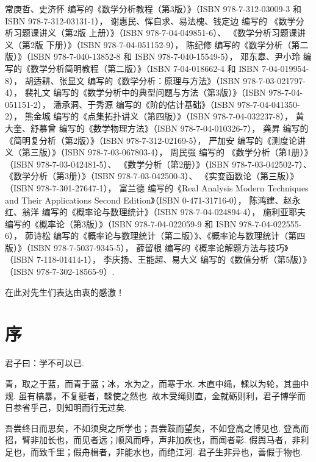 常庚哲、史济怀 编写的《数学分析教程（第3版）》（ISBN 978-7-312-03009-3 和 ISBN 978-7-312-03131-1），
谢惠民、恽自求、易法槐、钱定边 编写的
《数学分析习题课讲义（第2版 上册）》（ISBN 978-7-04-049851-6）、
《数学分析习题课讲义（第2版 下册）》（ISBN 978-7-04-051152-9），
陈纪修 编写的《数学分析（第二版）》（ISBN 978-7-040-13852-8 和 ISBN 978-7-040-15549-5），
邓东皋、尹小玲 编写的《数学分析简明教程（第二版）》（ISBN 7-04-018662-4 和 ISBN 7-04-019954-8），
胡适耕、张显文 编写的《数学分析：原理与方法》（ISBN 978-7-03-021797-4），
裴礼文 编写的《数学分析中的典型问题与方法（第3版）》（ISBN 978-7-04-051151-2），
潘承洞、于秀源 编写的《阶的估计基础》（ISBN 978-7-04-041350-2），
熊金城 编写的《点集拓扑讲义（第四版）》（ISBN 978-7-04-032237-8），
黄大奎、舒慕曾 编写的《数学物理方法》（ISBN 978-7-04-010326-7），
龚昇 编写的《简明复分析（第2版）》（ISBN 978-7-312-02169-5），
严加安 编写的《测度论讲义（第三版）》（ISBN 978-7-03-067803-4），
周民强 编写的
《数学分析（第1册）》（ISBN 978-7-03-042481-5）、
《数学分析（第2册）》（ISBN 978-7-03-042502-7）、
《数学分析（第3册）》（ISBN 978-7-03-042500-3）、
《实变函数论（第三版）》（ISBN 978-7-301-27647-1），
富兰德 编写的《Real Analysis Modern Techniques and Their Applications Second Edition》（ISBN 0-471-31716-0），
陈鸿建、赵永红、翁洋 编写的《概率论与数理统计》（ISBN 978-7-04-024894-4），
施利亚耶夫 编写的《概率论（第3版）》（ISBN 978-7-04-022059-9 和 ISBN 978-7-04-022555-6），
茆诗松 编写的《概率论与数理统计（第二版）》、《概率论与数理统计（第四版）》（ISBN 978-7-5037-9345-5），
薛留根 编写的《概率论解题方法与技巧》（ISBN 7-118-01414-1），
李庆扬、王能超、易大义 编写的《数值分析（第5版）》（ISBN 978-7-302-18565-9）.

在此对先生们表达由衷的感激！

\cleardoublepage
\chapter*{序}
君子曰：学不可以已.

青，取之于蓝，而青于蓝；冰，水为之，而寒于水.
木直中绳，輮以为轮，其曲中规.
虽有槁暴，不复挺者，輮使之然也.
故木受绳则直，金就砺则利，君子博学而日参省乎己，则知明而行无过矣.

吾尝终日而思矣，不如须臾之所学也；吾尝跂而望矣，不如登高之博见也.
登高而招，臂非加长也，而见者远；顺风而呼，声非加疾也，而闻者彰.
假舆马者，非利足也，而致千里；假舟楫者，非能水也，而绝江河.
君子生非异也，善假于物也.

